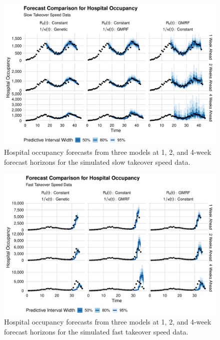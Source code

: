 \begin{figure}
    \centering
    \includegraphics[width=1.0\columnwidth]{simulated_forecast_comparison_data_hospitalizations_slow_plot}
\caption[Hospital occupancy forecasts for simulated slow takeover speed data.]{Hospital occupancy forecasts from three models at 1, 2, and 4-week forecast horizons for the simulated slow takeover speed data.}
    \label{ch_5:fig:simulated_forecast_comparison_data_hospitalizations_slow_plot}
\end{figure}

\begin{figure}
    \centering
    \includegraphics[width=1.0\columnwidth]{simulated_forecast_comparison_data_hospitalizations_fast_plot}
\caption[Hospital occupancy forecasts for simulated fast takeover speed data.]{Hospital occupancy forecasts from three models at 1, 2, and 4-week forecast horizons for the simulated fast takeover speed data.}
    \label{ch_5:fig:simulated_forecast_comparison_data_hospitalizations_fast_plot}
\end{figure}


